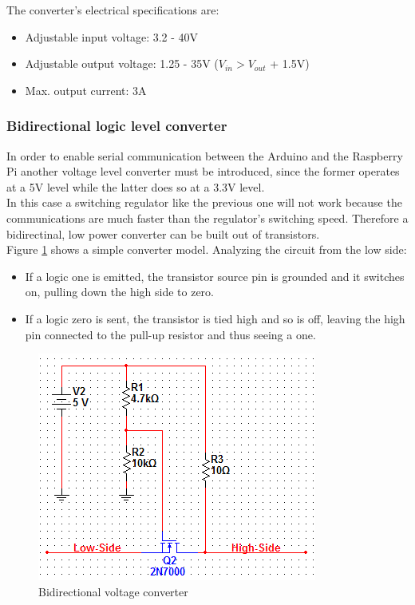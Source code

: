 		The converter's electrical specifications are:
			\begin{itemize}
				\item Adjustable input voltage: 3.2 - 40V
				\item Adjustable output voltage: 1.25 - 35V ($V_{in} > V_{out}$ + 1.5V)       
				\item Max. output current: 3A
			\end{itemize}

	\subsubsection{Bidirectional logic level converter}

		In order to enable serial communication between the Arduino and the Raspberry Pi another voltage level converter must be introduced, since the former operates at a 5V level while the latter does so at a 3.3V level.\\

		In this case a switching regulator like the previous one will not work because the communications are much faster than the regulator's switching speed. Therefore a bidirectinal, low power converter can be built out of transistors.\\

		Figure \ref{figure:levelShifter} shows a simple converter model.
		Analyzing the circuit from the low side: 
			\begin{itemize}
			\item If a logic one is emitted, the transistor source pin is grounded and it switches on, pulling down the high side to zero.
			\item If a logic zero is sent, the transistor is tied high and so is off, leaving the high pin connected to the pull-up resistor and thus seeing a one.
			\end{itemize}

			\begin{figure}[H]
					\centering
					\includegraphics[scale=0.8]{images/ProjectComponents/level-converter-circuit.png}
					\caption{Bidirectional voltage converter}
					\label{figure:levelShifter}
			\end{figure}
			\bigskip

